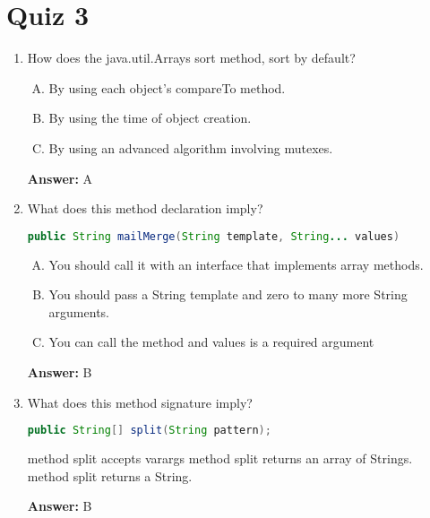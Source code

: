 \documentclass[12pt]{article}
\begin{document}
\bigskip

\bigskip

\section{Quiz 3}


\bigskip

\begin{enumerate}[1.]
    \item

    How does the java.util.Arrays sort method, sort by default?

    \begin{enumerate}[A.]
        \item By using each object's compareTo method.
        \item By using the time of object creation.
        \item By using an advanced algorithm involving mutexes.
    \end{enumerate}

    \bigskip

    \textbf{Answer:} A

    \item

    What does this method declaration imply?

    \begin{lstlisting}[language=Java]
        public String mailMerge(String template, String... values)
    \end{lstlisting}

    \begin{enumerate}[A.]
        \item You should call it with an interface that implements array methods.
        \item You should pass a String template and zero to many more String arguments.
        \item You can call the method and values is a required argument
    \end{enumerate}

    \bigskip

    \textbf{Answer:} B

    \item

    What does this method signature imply?

    \begin{lstlisting}[language=Java]
        public String[] split(String pattern);
    \end{lstlisting}

    \begin{enumerate}[A.]
        \itemThe method split accepts varargs
        \itemThe method split returns an array of Strings.
        \itemThe method split returns a String.
    \end{enumerate}

    \bigskip

    \textbf{Answer:} B

\end{enumerate}
\end{document}
